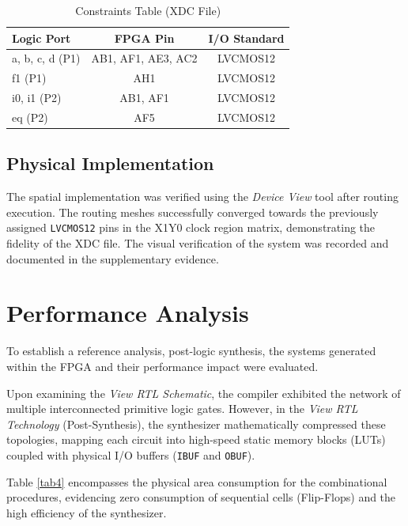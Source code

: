 \documentclass[conference]{IEEEtran}
\begin{document}
\begin{table}[htbp]
\caption{Constraints Table (XDC File)}
\begin{center}
\begin{tabular}{lcc}
\toprule
\textbf{Logic Port} & \textbf{FPGA Pin} & \textbf{I/O Standard} \\
\midrule
a, b, c, d (P1) & AB1, AF1, AE3, AC2 & LVCMOS12 \\
f1 (P1) & AH1 & LVCMOS12 \\
i0, i1 (P2) & AB1, AF1 & LVCMOS12 \\
eq (P2) & AF5 & LVCMOS12 \\
\bottomrule
\end{tabular}
\label{tab3}
\end{center}
\end{table}

\subsection{Physical Implementation}
The spatial implementation was verified using the \textit{Device View} tool after routing execution. The routing meshes successfully converged towards the previously assigned \texttt{LVCMOS12} pins in the X1Y0 clock region matrix, demonstrating the fidelity of the XDC file. The visual verification of the system was recorded and documented in the supplementary evidence.

\section{Performance Analysis}
To establish a reference analysis, post-logic synthesis, the systems generated within the FPGA and their performance impact were evaluated. 

Upon examining the \textit{View RTL Schematic}, the compiler exhibited the network of multiple interconnected primitive logic gates. However, in the \textit{View RTL Technology} (Post-Synthesis), the synthesizer mathematically compressed these topologies, mapping each circuit into high-speed static memory blocks (LUTs) coupled with physical I/O buffers (\texttt{IBUF} and \texttt{OBUF}). 

Table \ref{tab4} encompasses the physical area consumption for the combinational procedures, evidencing zero consumption of sequential cells (Flip-Flops) and the high efficiency of the synthesizer.
\end{document}
